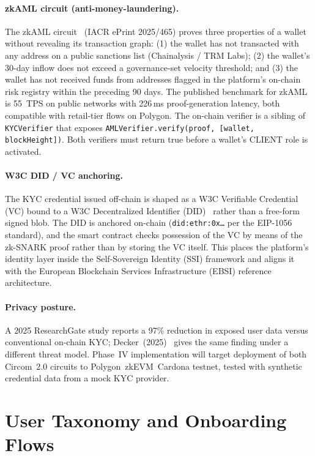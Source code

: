 \documentclass[12pt, a4paper]{report}
\begin{document}
\paragraph{zkAML circuit (anti-money-laundering).}
The zkAML circuit~ (IACR ePrint 2025/465) proves three properties of a wallet without revealing its transaction graph: (1) the wallet has not transacted with any address on a public sanctions list (Chainalysis / TRM Labs); (2) the wallet's 30-day inflow does not exceed a governance-set velocity threshold; and (3) the wallet has not received funds from addresses flagged in the platform's on-chain risk registry within the preceding 90 days. The published benchmark for zkAML is 55~TPS on public networks with 226\,ms proof-generation latency, both compatible with retail-tier flows on Polygon. The on-chain verifier is a sibling of \texttt{KYCVerifier} that exposes \texttt{AMLVerifier.verify(proof, [wallet, blockHeight])}. Both verifiers must return true before a wallet's CLIENT role is activated.

\paragraph{W3C DID / VC anchoring.}
The KYC credential issued off-chain is shaped as a W3C Verifiable Credential (VC) bound to a W3C Decentralized Identifier (DID)~ rather than a free-form signed blob. The DID is anchored on-chain (\texttt{did:ethr:0x\ldots} per the EIP-1056 standard), and the smart contract checks possession of the VC by means of the zk-SNARK proof rather than by storing the VC itself. This places the platform's identity layer inside the Self-Sovereign Identity (SSI) framework and aligns it with the European Blockchain Services Infrastructure (EBSI) reference architecture.

\paragraph{Privacy posture.}
A 2025 ResearchGate study reports a 97\% reduction in exposed user data versus conventional on-chain KYC; Decker~(2025)~ gives the same finding under a different threat model. Phase~IV implementation will target deployment of both Circom~2.0 circuits to Polygon~zkEVM~Cardona testnet, tested with synthetic credential data from a mock KYC provider.

\section{User Taxonomy and Onboarding Flows}
\label{sec:onboarding}
\end{document}
